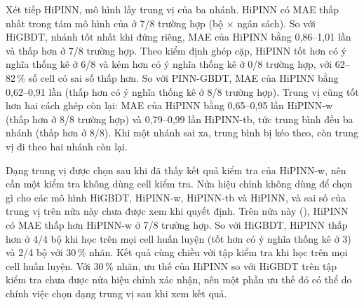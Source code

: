 Xét tiếp HiPINN, mô hình lấy trung vị của ba nhánh. HiPINN có MAE thấp nhất trong tám mô hình của  ở 7/8 trường hợp (bộ $\times$ ngân sách). So với HiGBDT, nhánh tốt nhất khi đứng riêng, MAE của HiPINN bằng 0{,}86--1{,}01 lần và thấp hơn ở 7/8 trường hợp. Theo kiểm định ghép cặp, HiPINN tốt hơn có ý nghĩa thống kê ở 6/8 và kém hơn có ý nghĩa thống kê ở 0/8 trường hợp, với 62--82\,\% số cell có sai số thấp hơn. So với PINN-GBDT, MAE của HiPINN bằng 0{,}62--0{,}91 lần (thấp hơn có ý nghĩa thống kê ở 8/8 trường hợp). Trung vị cũng tốt hơn hai cách ghép còn lại: MAE của HiPINN bằng 0{,}65--0{,}95 lần HiPINN-w (thấp hơn ở 8/8 trường hợp) và 0{,}79--0{,}99 lần HiPINN-tb, tức trung bình đều ba nhánh (thấp hơn ở 8/8). Khi một nhánh sai xa, trung bình bị kéo theo, còn trung vị đi theo hai nhánh còn lại.

Dạng trung vị được chọn sau khi đã thấy kết quả kiểm tra của HiPINN-w, nên cần một kiểm tra không dùng cell kiểm tra. Nửa hiệu chỉnh không dùng để chọn gì cho các mô hình HiGBDT, HiPINN-w, HiPINN-tb và HiPINN, và sai số của trung vị trên nửa này chưa được xem khi quyết định. Trên nửa này (), HiPINN có MAE thấp hơn HiPINN-w ở 7/8 trường hợp. So với HiGBDT, HiPINN thấp hơn ở 4/4 bộ khi học trên mọi cell huấn luyện (tốt hơn có ý nghĩa thống kê ở 3) và 2/4 bộ với 30\,\% nhãn. Kết quả cùng chiều với tập kiểm tra khi học trên mọi cell huấn luyện. Với 30\,\% nhãn, ưu thế của HiPINN so với HiGBDT trên tập kiểm tra chưa được nửa hiệu chỉnh xác nhận, nên một phần ưu thế đó có thể do chính việc chọn dạng trung vị sau khi xem kết quả.

